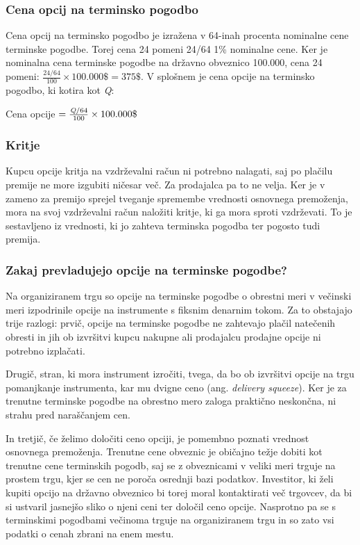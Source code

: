 \documentclass[a4paper]{article}
\begin{document}
\subsubsection{Cena opcij na terminsko pogodbo}
Cena opcij na terminsko pogodbo je izražena v 64-inah procenta nominalne cene terminske pogodbe. Torej cena 24 pomeni 24/64
1\% nominalne cene. Ker je nominalna cena terminske pogodbe na državno obveznico 100.000\textdollar, cena 24 pomeni:
\(\frac{24/64}{100} \times 100.000\$ = 375\$\). V splošnem je cena opcije na terminsko pogodbo, ki kotira kot \textit{Q}:
\begin{center}
    Cena opcije $ = \frac{\textit{\text{Q}}/64}{100} \times 100.000\$$
\end{center}

\subsubsection{Kritje}
Kupcu opcije kritja na vzdrževalni račun ni potrebno nalagati, saj po plačilu premije ne more izgubiti ničesar več. Za prodajalca pa to
ne velja. Ker je v zameno za premijo sprejel tveganje spremembe vrednosti osnovnega premoženja, mora na svoj vzdrževalni račun
naložiti kritje, ki ga mora sproti vzdrževati. To je sestavljeno iz vrednosti, ki jo zahteva terminska pogodba ter pogosto tudi premija.

\subsubsection{Zakaj prevladujejo opcije na terminske pogodbe?} \label{futuresvsphysicals}
Na organiziranem trgu so opcije na terminske pogodbe o obrestni meri v večinski meri izpodrinile opcije na instrumente s fiksnim
denarnim tokom. Za to obstajajo trije razlogi: prvič, opcije na terminske pogodbe ne zahtevajo plačil natečenih obresti in jih ob izvršitvi kupcu
nakupne ali prodajalcu prodajne opcije ni potrebno izplačati.

Drugič, stran, ki mora instrument izročiti, tvega, da bo ob izvršitvi opcije na trgu pomanjkanje instrumenta, kar mu dvigne ceno (ang. \textit{delivery squeeze}).
Ker je za trenutne terminske pogodbe na obrestno mero zaloga praktično neskončna, ni strahu pred naraščanjem cen. 

In tretjič, če želimo določiti ceno opciji, je pomembno poznati vrednost osnovnega premoženja.
Trenutne cene obveznic je običajno težje dobiti kot trenutne cene terminskih pogodb, saj se z obveznicami v veliki meri trguje na prostem trgu, kjer
se cen ne poroča osrednji bazi podatkov. Investitor, ki želi kupiti opcijo na državno obveznico bi torej moral kontaktirati več trgovcev, 
da bi si ustvaril jasnejšo sliko o njeni ceni ter določil ceno opcije. Nasprotno pa se s terminskimi pogodbami večinoma trguje na organiziranem trgu in so zato vsi 
podatki o cenah zbrani na enem mestu. 
\end{document}
